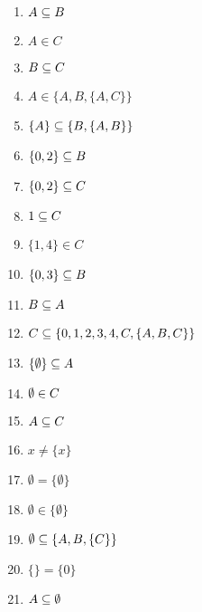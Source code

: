 \documentclass[12pt]{exam}
\begin{document}
    \begin{multicols}{2}
        \begin{enumerate}[label={\arabic*})]
            \item $A \subseteq B$

            \item $A \in C$

            \item $B \subseteq C$

            \item $A \in \{A, B, \{A, C\}\}$

            \item $\{A\} \subseteq \{B, \{A, B\}\}$

            \item $\{0,2\} \subseteq B$

            \item $\{0,2\} \subseteq C$

            \item $1 \subseteq C$

            \item $\{1,4\} \in C$

            \item $\{0,3\} \subseteq B$

            \item $B \subseteq A$

            \item $C \subseteq \{0, 1, 2, 3, 4, C, \{A, B, C\}\}$

            \item $\{\emptyset\} \subseteq A$

            \item $\emptyset \in C$

            \item $A \subseteq C$

            \item $x \neq \{x\}$

            \item $\emptyset = \{\emptyset\}$

            \item $\emptyset \in \{\emptyset\}$

            \item $\emptyset \subseteq \{A, B, \{C\}\}$

            \item $\{\} = \{0\}$

            \item $A \subseteq \emptyset$


\end{enumerate}
\end{multicols}
\end{document}
